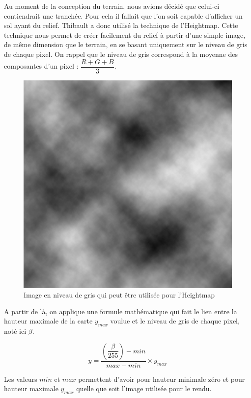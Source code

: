 \documentclass[11pt]{report}
\begin{document}
Au moment de la conception du terrain, nous avions décidé que celui-ci contiendrait une tranchée. Pour cela il fallait que l'on soit capable d'afficher un sol ayant du relief. Thibault a donc utilisé la technique de l'Heightmap. Cette technique nous permet de créer facilement du relief à partir d'une simple image, de même dimension que le terrain, en se basant uniquement sur le niveau de gris de chaque pixel. On rappel que le niveau de gris correspond à la moyenne des composantes d'un pixel : \( \dfrac{R + G + B}{3} \). 

\begin{figure}[htbp]
\centering
\includegraphics[scale=0.6]{heightmap-texture.png}
\caption{Image en niveau de gris qui peut être utilisée pour l'Heightmap}
\label{fig-heightmap-texture}
\end{figure}

A partir de là, on applique une formule mathématique qui fait le lien entre la hauteur maximale de la carte \( y_{max} \) voulue et le niveau de gris de chaque pixel, noté ici \( \beta \).

\[
y = \dfrac{\left(\dfrac{\beta}{255}\right) - min}{max - min} \times y_{max}
\]

Les valeurs \( min \) et \( max \) permettent d'avoir pour hauteur minimale zéro et pour hauteur maximale \( y_{max} \) quelle que soit l'image utilisée pour le rendu.
\end{document}
